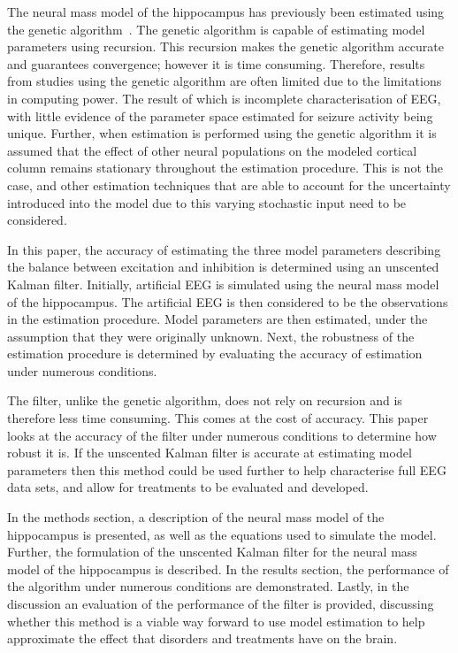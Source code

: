 The neural mass model of the hippocampus has previously been estimated using the genetic algorithm~\citep{wendling2005interictal}. The genetic algorithm is capable of estimating model parameters using recursion. This recursion makes the genetic algorithm accurate and guarantees convergence; however it is time consuming. Therefore, results from studies using the genetic algorithm are often limited due to the limitations in computing power. The result of which is incomplete characterisation of EEG, with little evidence of the parameter space estimated for seizure activity being unique. Further, when estimation is performed using the genetic algorithm it is assumed that the effect of other neural populations on the modeled cortical column remains stationary throughout the estimation procedure. This is not the case, and other estimation techniques that are able to account for the uncertainty introduced into the model due to this varying stochastic input need to be considered. 





In this paper, the accuracy of estimating the three model parameters describing the balance between excitation and inhibition is determined using an unscented Kalman filter. Initially, artificial EEG is simulated using the neural mass model of the hippocampus. The artificial EEG is then considered to be the observations in the estimation procedure. Model parameters are then estimated, under the assumption that they were originally unknown. Next, the robustness of the estimation procedure is determined by evaluating the accuracy of estimation under numerous conditions.

The filter, unlike the genetic algorithm, does not rely on recursion and is therefore less time consuming. This comes at the cost of accuracy. This paper looks at the accuracy of the filter under numerous conditions to determine how robust it is. If the unscented Kalman filter is accurate at estimating model parameters then this method could be used further to help characterise full EEG data sets, and allow for treatments to be evaluated and developed.

In the methods section, a description of the neural mass model of the hippocampus is presented, as well as the equations used to simulate the model. Further, the formulation of the unscented Kalman filter for the neural mass model of the hippocampus is described. In the results section, the performance of the algorithm under numerous conditions are demonstrated. Lastly, in the discussion an evaluation of the performance of the filter is provided, discussing whether this method is a viable way forward to use model estimation to help approximate the effect that disorders and treatments have on the brain. 